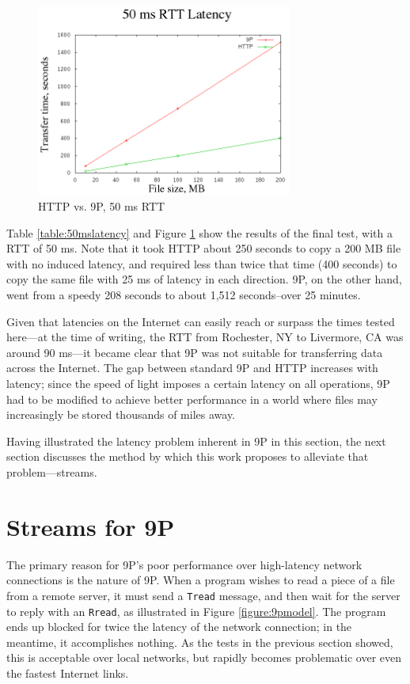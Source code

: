 \documentclass[11pt,american]{report}
\begin{document}
\begin{figure}[h]
	\begin{center}
		\includegraphics[width=0.75\textwidth]{50ms.png}
	\end{center}
	\caption{HTTP vs. 9P, 50 ms RTT}
	\label{figure:50ms}
\end{figure}

Table \ref{table:50mslatency} and Figure \ref{figure:50ms} show the results of the final test, with a RTT of 50 ms. Note that it took HTTP about 250 seconds to copy a 200 MB file with no induced latency, and required less than twice that time (400 seconds) to copy the same file with 25 ms of latency in each direction. 9P, on the other hand, went from a speedy 208 seconds to about 1,512 seconds--over 25 minutes.

Given that latencies on the Internet can easily reach or surpass the times tested here---at the time of writing, the RTT from Rochester, NY to Livermore, CA was around 90 ms---it became clear that 9P was not suitable for transferring data across the Internet. The gap between standard 9P and HTTP increases with latency; since the speed of light imposes a certain latency on all operations, 9P had to be modified to achieve better performance in a world where files may increasingly be stored thousands of miles away.

Having illustrated the latency problem inherent in 9P in this section, the next section discusses the method by which this work proposes to alleviate that problem---streams.

\section{Streams for 9P}

The primary reason for 9P's poor performance over high-latency network connections is the  nature of 9P. When a program wishes to read a piece of a file from a remote server, it must send a {\tt Tread} message, and then wait for the server to reply with an {\tt Rread}, as illustrated in Figure \ref{figure:9pmodel}. The program ends up blocked for twice the latency of the network connection; in the meantime, it accomplishes nothing. As the tests in the previous section showed, this is acceptable over local networks, but rapidly becomes problematic over even the fastest Internet links.
\end{document}
